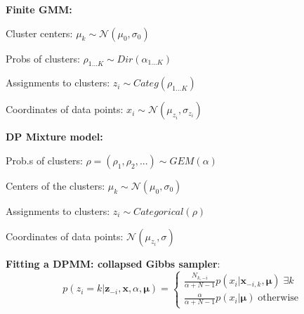 \textbf{Finite GMM:}\\
\begin{inparaitem}[\color{black}\textbullet]
    \item Cluster centers: $\mu_k \sim \mathcal{N}(\mu_0, \sigma_0)$ \\
    \item Probs of clusters: $\rho_{1...K}\sim Dir(\alpha_{1...K})$\\
    \item Assignments to clusters: $z_i \sim Categ(\rho_{1...K})$ \\
    \item Coordinates of data points: $x_i \sim \mathcal{N}(\mu_{z_i}, \sigma_{z_i})$
\end{inparaitem}
\textbf{DP Mixture model:} \\
\begin{inparaitem}[\color{black}\textbullet]
    \item Prob.s of clusters: $\rho = (\rho_1, \rho_2,...) \sim  GEM(\alpha)$ \\
    \item Centers of the clusters: $\mu_k \sim \mathcal{N}(\mu_0, \sigma_0)$ \\
    \item Assignments to clusters: $z_i \sim Categorical(\rho)$ \\
    \item Coordinates of data points: $\mathcal{N}(\mu_{z_i}, \sigma)$
\end{inparaitem}

\textbf{Fitting a DPMM: collapsed Gibbs sampler}:\\
\[ p(z_i=k|\bm{z}_{-i},\bm{x},\alpha,\bm{\mu}) = \begin{cases}
      \frac{N_{k,-i}}{\alpha + N - 1} p(x_i|\bm{x}_{-i,k},\bm{\mu}) \;\exists k \\
      \frac{\alpha}{\alpha + N - 1} p(x_i|\bm{\mu}) \;\text{otherwise}
   \end{cases}
\]



